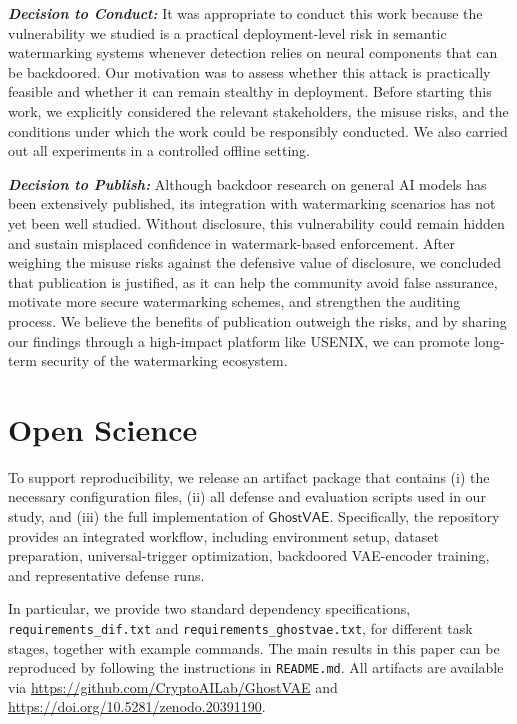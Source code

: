 \documentclass[letterpaper,twocolumn,10pt]{article}
\newcommand{\mg}{$\mathsf{GhostVAE}$\xspace}
\newcommand{\mypara}[1]{\smallskip\noindent{\bf {#1}.} \xspace}
\begin{document}
\mypara{Decision Justifications}

\emph{\textbf{Decision to Conduct:}}
It was appropriate to conduct this work because the vulnerability we studied is a practical deployment-level risk in semantic watermarking systems whenever detection relies on neural components that can be backdoored. Our motivation was to assess whether this attack is practically feasible and whether it can remain stealthy in deployment. Before starting this work, we explicitly considered the relevant stakeholders, the misuse risks, and the conditions under which the work could be responsibly conducted. We also carried out all experiments in a controlled offline setting.


\emph{\textbf{Decision to Publish:}}
Although backdoor research on general AI models has been extensively published, its integration with watermarking scenarios has not yet been well studied. Without disclosure, this vulnerability could remain hidden and sustain misplaced confidence in watermark-based enforcement. After weighing the misuse risks against the defensive value of disclosure, we concluded that publication is justified, as it can help the community avoid false assurance, motivate more secure watermarking schemes, and strengthen the auditing process. We believe the benefits of publication outweigh the risks, and by sharing our findings through a high-impact platform like USENIX, we can promote long-term security of the watermarking ecosystem.

\section*{Open Science}
To support reproducibility, we release an artifact package that contains (i) the necessary configuration files, (ii) all defense and evaluation scripts used in our study, and (iii) the full implementation of \mg.
Specifically, the repository provides an integrated workflow, including environment setup, dataset preparation, universal-trigger optimization, backdoored VAE-encoder training, and representative defense runs.

In particular, we provide two standard dependency specifications, \texttt{requirements\_dif.txt} and \texttt{requirements\_ghostvae.txt}, for different task stages, together with example commands.
The main results in this paper can be reproduced by following the instructions in \texttt{README.md}.
All artifacts are available via \url{https://github.com/CryptoAILab/GhostVAE} and \url{https://doi.org/10.5281/zenodo.20391190}.
\end{document}
